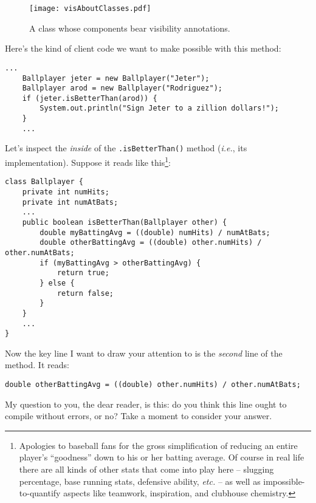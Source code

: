 \begin{figure}[hb]
\centering
\texttt{[image: visAboutClasses.pdf]}
\caption{A class whose components bear visibility annotations.}
\label{fig:visAboutClasses}
\end{figure}

Here's the kind of client code we want to make possible with this method:

\begin{Verbatim}[fontsize=\small,samepage=true,frame=single]
    ...
    Ballplayer jeter = new Ballplayer("Jeter");
    Ballplayer arod = new Ballplayer("Rodriguez");
    if (jeter.isBetterThan(arod)) {
        System.out.println("Sign Jeter to a zillion dollars!");
    }
    ...
\end{Verbatim}

Let's inspect the \textit{inside} of the \texttt{.isBetterThan()} method
(\textit{i.e.}, its implementation). Suppose it reads like
this\footnote{Apologies to baseball fans for the gross simplification of
reducing an entire player's ``goodness'' down to his or her batting average. Of
course in real life there are all kinds of other stats that come into play
here -- slugging percentage, base running stats, defensive ability,
\textit{etc.} -- as well as impossible-to-quantify aspects like teamwork,
inspiration, and clubhouse chemistry.}:

\begin{Verbatim}[fontsize=\footnotesize,samepage=true,frame=single]
class Ballplayer {
    private int numHits;
    private int numAtBats;
    ...
    public boolean isBetterThan(Ballplayer other) {
        double myBattingAvg = ((double) numHits) / numAtBats;
        double otherBattingAvg = ((double) other.numHits) / other.numAtBats;
        if (myBattingAvg > otherBattingAvg) {
            return true;
        } else {
            return false;
        }
    }
    ...
}
\end{Verbatim}

Now the key line I want to draw your attention to is the \textit{second} line
of the method. It reads:

\begin{verbatim}
double otherBattingAvg = ((double) other.numHits) / other.numAtBats;
\end{verbatim}

My question to you, the dear reader, is this: do you think this line ought to
compile without errors, or no? Take a moment to consider your answer.


